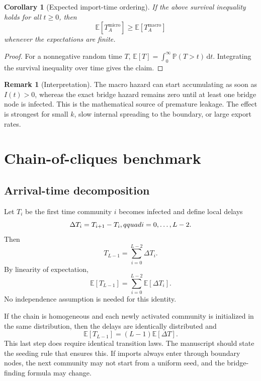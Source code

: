 \documentclass[12pt,a4paper]{article}
\newtheorem{corollary}{Corollary}
\theoremstyle{definition}
\newtheorem{remark}{Remark}
\newcommand{\E}{\mathbb{E}}
\newcommand{\Prob}{\mathbb{P}}
\newcommand{\1}{\mathbf{1}}
\newcommand{\dint}{\,\mathrm{d}}
\begin{document}
\begin{corollary}[Expected import-time ordering]
If the above survival inequality holds for all $t\ge 0$, then
\begin{equation}
    \E[T_A^{\mathrm{micro}}]\ge \E[T_A^{\mathrm{macro}}]
\end{equation}
whenever the expectations are finite.
\end{corollary}

\begin{proof}
For a nonnegative random time $T$, $\E[T]=\int_0^\infty \Prob(T>t)\dint t$.  Integrating the survival inequality over time gives the claim.
\end{proof}

\begin{remark}[Interpretation]
The macro hazard can start accumulating as soon as $I(t)>0$, whereas the exact bridge hazard remains zero until at least one bridge node is infected.  This is the mathematical source of premature leakage.  The effect is strongest for small $k$, slow internal spreading to the boundary, or large export rates.
\end{remark}

\section{Chain-of-cliques benchmark}

\subsection{Arrival-time decomposition}

Let $T_i$ be the first time community $i$ becomes infected and define local delays
\begin{equation}
    \Delta T_i=T_{i+1}-T_i,\\qquad i=0,\ldots,L-2.
\end{equation}
Then
\begin{equation}
    T_{L-1}=\sum_{i=0}^{L-2}\Delta T_i.
\end{equation}
By linearity of expectation,
\begin{equation}
    \E[T_{L-1}]=\sum_{i=0}^{L-2}\E[\Delta T_i].
\end{equation}
No independence assumption is needed for this identity.

If the chain is homogeneous and each newly activated community is initialized in the same distribution, then the delays are identically distributed and
\begin{equation}
    \E[T_{L-1}]=(L-1)\E[\Delta T].
\end{equation}
This last step does require identical transition laws.  The manuscript should state the seeding rule that ensures this.  If imports always enter through boundary nodes, the next community may not start from a uniform seed, and the bridge-finding formula may change.
\end{document}
